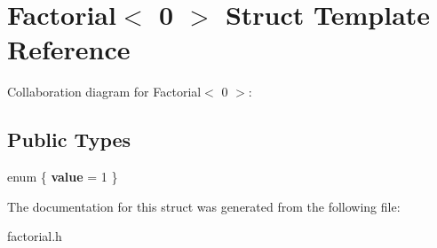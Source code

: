 \hypertarget{structFactorial_3_010_01_4}{\section{Factorial$<$ 0 $>$ Struct Template Reference}
\label{structFactorial_3_010_01_4}
}


Collaboration diagram for Factorial$<$ 0 $>$\-:
\subsection*{Public Types}
\begin{DoxyCompactItemize}
\item 
enum \{ {\bfseries value} =  1
 \}
\end{DoxyCompactItemize}


The documentation for this struct was generated from the following file\-:\begin{DoxyCompactItemize}
\item 
factorial.\-h\end{DoxyCompactItemize}
